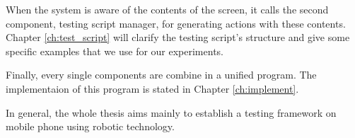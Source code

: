 When the system is aware of the contents of the screen, it calls the second component, testing script manager, for generating actions with these contents. Chapter \ref{ch:test_script} will clarify the testing script's structure and give some specific examples that we use for our experiments.

Finally, every single components are combine in a unified program. The implementaion of this program is stated in Chapter \ref{ch:implement}.

In general, the whole thesis aims mainly to establish a testing framework on mobile phone using robotic technology. \nocite{radim_thesis}

